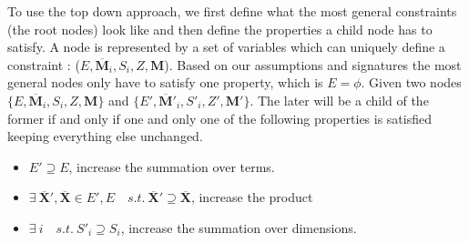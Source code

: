 \documentclass{article}
\newcommand{\TX}{\textbf{X}\xspace}
\newcommand{\TY}{\textbf{Y}\xspace}
\newcommand{\TM}{\textbf{M}\xspace}
\begin{document}

To use the top down approach, we first define what the most general constraints (the root nodes) look like and then define the properties a child node has to satisfy. A node is represented by a set of variables which can uniquely define a constraint : ($E, \overline{\TM}_i,S_{i}, Z, \TM$). Based on our assumptions and signatures the most general nodes only have to satisfy one property, which is $E=\phi$.
Given two nodes $\{E, \overline{\TM}_i,S_{i}, Z, \TM\}$ and $\{E', \overline{\TM}'_i,S'_{i}, Z', \TM' \}$. The later will be a child of the former if and only if one and only one of the following properties is satisfied keeping everything else unchanged.
\begin{itemize}
\item $E' \supseteq E$, increase the summation over terms.
\item $\exists \ \overline{\TX}',\overline{\TX} \in E',E \quad s.t. \  \overline{\TX}' \supseteq \overline{\TX}$, increase the product 
\item $\exists \ i \quad s.t. \ S'_i \supseteq S_i$, increase the summation over dimensions.
\end{itemize}
\end{document}

